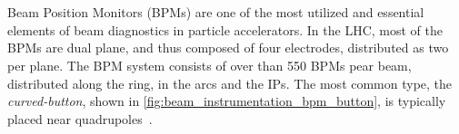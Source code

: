 \section{}


\subsection{}

Beam Position Monitors (BPMs) are one of the most utilized and essential elements of beam 
diagnostics in particle accelerators. In the LHC, most of the BPMs are dual plane, and thus composed
of four electrodes, distributed as two per plane. The BPM system consists of over than 550 BPMs pear
beam, distributed along the ring, in the arcs and the IPs. The most common type, the
\textit{curved-button}, shown in \cref{fig:beam_instrumentation_bpm_button}, is typically placed
near quadrupoles~\cite{wendt_bpm_2020}.

